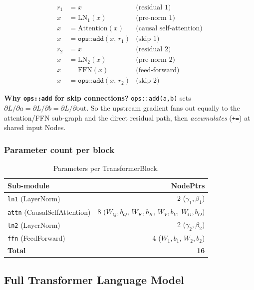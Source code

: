 \documentclass[12pt, a4paper]{article}
\begin{document}
\begin{align*}
  r_1 &= x                              & \text{(residual 1)} \\
  x   &= \text{LN}_1(x)                 & \text{(pre-norm 1)} \\
  x   &= \text{Attention}(x)            & \text{(causal self-attention)} \\
  x   &= \texttt{ops::add}(x,\, r_1)   & \text{(skip 1)} \\
  r_2 &= x                              & \text{(residual 2)} \\
  x   &= \text{LN}_2(x)                 & \text{(pre-norm 2)} \\
  x   &= \text{FFN}(x)                  & \text{(feed-forward)} \\
  x   &= \texttt{ops::add}(x,\, r_2)   & \text{(skip 2)}
\end{align*}

\textbf{Why \texttt{ops::add} for skip connections?}  \texttt{ops::add(a,b)} sets
\(\partial L/\partial a = \partial L/\partial b = \partial L/\partial \text{out}\).
So the upstream gradient fans out equally to the attention/FFN sub-graph and the
direct residual path, then \emph{accumulates} (\texttt{+=}) at shared input Nodes.

\subsubsection{Parameter count per block}

\begin{table}[!ht]
\centering
\renewcommand{\arraystretch}{1.3}
\begin{tabular}{@{} l r @{}}
\toprule
Sub-module & NodePtrs \\
\midrule
\texttt{ln1}  (LayerNorm)         &  2 \;(\(\gamma_1, \beta_1\)) \\
\texttt{attn} (CausalSelfAttention) & 8 \;(\(W_Q,b_Q,\, W_K,b_K,\, W_V,b_V,\, W_O,b_O\)) \\
\texttt{ln2}  (LayerNorm)         &  2 \;(\(\gamma_2, \beta_2\)) \\
\texttt{ffn}  (FeedForward)       &  4 \;(\(W_1,b_1,\, W_2,b_2\)) \\
\midrule
\textbf{Total}                    & \textbf{16} \\
\bottomrule
\end{tabular}
\caption{Parameters per TransformerBlock.}
\end{table}

\subsection{Full Transformer Language Model}
\end{document}
